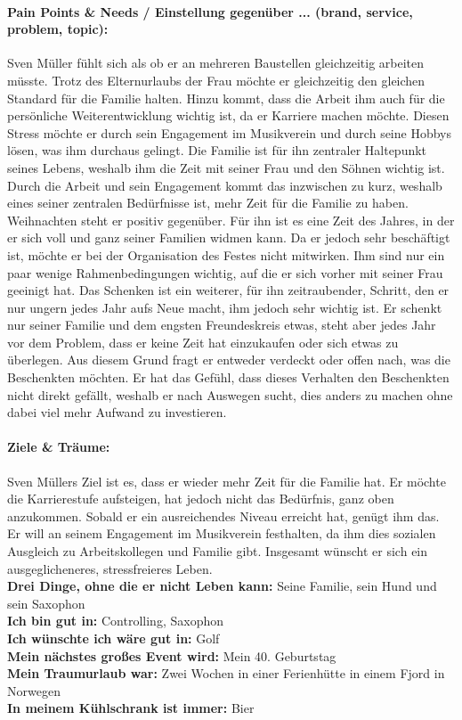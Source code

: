 \documentclass[12pt,ngerman, fleqn]{book} %
\begin{document}
\paragraph{Pain Points & Needs / Einstellung gegenüber ... (brand, service, problem, topic):}
Sven Müller fühlt sich als ob er an mehreren Baustellen gleichzeitig arbeiten müsste. Trotz des Elternurlaubs der Frau möchte er gleichzeitig den gleichen Standard für die Familie halten. Hinzu kommt, dass die Arbeit ihm auch für die persönliche Weiterentwicklung wichtig ist, da er Karriere machen möchte. Diesen Stress möchte er durch sein Engagement im Musikverein und durch seine Hobbys lösen, was ihm durchaus gelingt. Die Familie ist für ihn zentraler Haltepunkt seines Lebens, weshalb ihm die Zeit mit seiner Frau und den Söhnen wichtig ist. Durch die Arbeit und sein Engagement kommt das inzwischen zu kurz, weshalb eines seiner zentralen Bedürfnisse ist, mehr Zeit für die Familie zu haben.\\
Weihnachten steht er positiv gegenüber. Für ihn ist es eine Zeit des Jahres, in der er sich voll und ganz seiner Familien widmen kann. Da er jedoch sehr beschäftigt ist, möchte er bei der Organisation des Festes nicht mitwirken. Ihm sind nur ein paar wenige Rahmenbedingungen wichtig, auf die er sich vorher mit seiner Frau geeinigt hat. Das Schenken ist ein weiterer, für ihn zeitraubender, Schritt, den er nur ungern jedes Jahr aufs Neue macht, ihm jedoch sehr wichtig ist. Er schenkt nur seiner Familie und dem engsten Freundeskreis etwas, steht aber jedes Jahr vor dem Problem, dass er keine Zeit hat einzukaufen oder sich etwas zu überlegen. Aus diesem Grund fragt er entweder verdeckt oder offen nach, was die Beschenkten möchten. Er hat das Gefühl, dass dieses Verhalten den Beschenkten nicht direkt gefällt, weshalb er nach Auswegen sucht, dies anders zu machen ohne dabei viel mehr Aufwand zu investieren.\\
\hline
\paragraph{Ziele & Träume:}
Sven Müllers Ziel ist es, dass er wieder mehr Zeit für die Familie hat. Er möchte die Karrierestufe aufsteigen, hat jedoch nicht das Bedürfnis, ganz oben anzukommen. Sobald er ein ausreichendes Niveau erreicht hat, genügt ihm das. Er will an seinem Engagement im Musikverein festhalten, da ihm dies sozialen Ausgleich zu Arbeitskollegen und Familie gibt. Insgesamt wünscht er sich ein ausgeglicheneres, stressfreieres Leben.\\
\hline
\textbf{Drei Dinge, ohne die er nicht Leben kann:} Seine Familie, sein Hund und sein Saxophon \\
\textbf{Ich bin gut in:} Controlling, Saxophon\\
\textbf{Ich wünschte ich wäre gut in:} Golf \\
\textbf{Mein nächstes großes Event wird:} Mein 40. Geburtstag \\
\textbf{Mein Traumurlaub war:} Zwei Wochen in einer Ferienhütte in einem Fjord in Norwegen \\
\textbf{In meinem Kühlschrank ist immer:} Bier \\
\hline
\end{document}
